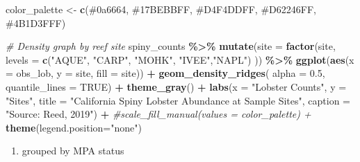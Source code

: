 \documentclass[
]{article}
\newenvironment{Shaded}{\begin{snugshade}}{\end{snugshade}}
\newcommand{\AttributeTok}[1]{\textcolor[rgb]{0.13,0.29,0.53}{#1}}
\newcommand{\CommentTok}[1]{\textcolor[rgb]{0.56,0.35,0.01}{\textit{#1}}}
\newcommand{\ConstantTok}[1]{\textcolor[rgb]{0.56,0.35,0.01}{#1}}
\newcommand{\FloatTok}[1]{\textcolor[rgb]{0.00,0.00,0.81}{#1}}
\newcommand{\FunctionTok}[1]{\textcolor[rgb]{0.13,0.29,0.53}{\textbf{#1}}}
\newcommand{\NormalTok}[1]{#1}
\newcommand{\OtherTok}[1]{\textcolor[rgb]{0.56,0.35,0.01}{#1}}
\newcommand{\SpecialCharTok}[1]{\textcolor[rgb]{0.81,0.36,0.00}{\textbf{#1}}}
\newcommand{\StringTok}[1]{\textcolor[rgb]{0.31,0.60,0.02}{#1}}
\providecommand{\tightlist}{%
  \setlength{\itemsep}{0pt}\setlength{\parskip}{0pt}}
\begin{document}
\begin{Shaded}
\begin{Highlighting}[]
\NormalTok{color\_palette }\OtherTok{\textless{}{-}} \FunctionTok{c}\NormalTok{(}\StringTok{\textquotesingle{}\#0a6664\textquotesingle{}}\NormalTok{, }\StringTok{\textquotesingle{}\#17BEBBFF\textquotesingle{}}\NormalTok{, }\StringTok{\textquotesingle{}\#D4F4DDFF\textquotesingle{}}\NormalTok{, }\StringTok{\textquotesingle{}\#D62246FF\textquotesingle{}}\NormalTok{, }\StringTok{\textquotesingle{}\#4B1D3FFF\textquotesingle{}}\NormalTok{)}

\CommentTok{\# Density graph by reef site }
\NormalTok{spiny\_counts }\SpecialCharTok{\%\textgreater{}\%} 
    \FunctionTok{mutate}\NormalTok{(}\AttributeTok{site =} \FunctionTok{factor}\NormalTok{(site, }
                         \AttributeTok{levels =} \FunctionTok{c}\NormalTok{(}\StringTok{"AQUE"}\NormalTok{, }\StringTok{"CARP"}\NormalTok{, }\StringTok{"MOHK"}\NormalTok{, }\StringTok{"IVEE"}\NormalTok{,}\StringTok{"NAPL"}\NormalTok{) }
\NormalTok{                         )) }\SpecialCharTok{\%\textgreater{}\%} 
    \FunctionTok{ggplot}\NormalTok{(}\FunctionTok{aes}\NormalTok{(}\AttributeTok{x =}\NormalTok{ obs\_lob, }\AttributeTok{y =}\NormalTok{ site, }\AttributeTok{fill =}\NormalTok{ site)) }\SpecialCharTok{+} 
    \FunctionTok{geom\_density\_ridges}\NormalTok{( }\AttributeTok{alpha =} \FloatTok{0.5}\NormalTok{, }
                         \AttributeTok{quantile\_lines =} \ConstantTok{TRUE}\NormalTok{) }\SpecialCharTok{+} 
    \FunctionTok{theme\_gray}\NormalTok{() }\SpecialCharTok{+} 
    \FunctionTok{labs}\NormalTok{(}\AttributeTok{x =} \StringTok{"Lobster Counts"}\NormalTok{, }
         \AttributeTok{y =} \StringTok{"Sites"}\NormalTok{,}
         \AttributeTok{title =} \StringTok{"California Spiny Lobster Abundance at Sample Sites"}\NormalTok{, }
         \AttributeTok{caption =} \StringTok{"Source: Reed, 2019"}\NormalTok{) }\SpecialCharTok{+} 
    \CommentTok{\#scale\_fill\_manual(values = color\_palette) + }
    \FunctionTok{theme}\NormalTok{(}\AttributeTok{legend.position=}\StringTok{"none"}\NormalTok{)}
\end{Highlighting}
\end{Shaded}

\begin{enumerate}
\def\labelenumi{\arabic{enumi})}
\setcounter{enumi}{1}
\tightlist
\item
  grouped by MPA status
\end{enumerate}
\end{document}
